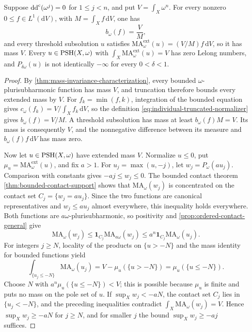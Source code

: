 \begin{theorem}\label{thm:invariant-mass-threshold-envelopes}
Suppose $\mathrm{dd}^{\mathrm{c}}(\omega^j)=0$ for $1\leq j<n$, and put $V=\int_X\omega^n$. For every nonzero $0\leq f\in L^1(\mathrm{d}V)$, with $M=\int_Xf\,\mathrm{d}V$, one has
\[
 b_\omega(f)=\frac VM,
\]
and every threshold subsolution $u$ satisfies $\mathrm{MA}^{\mathrm{ext}}_\omega(u)=(V/M)f\,\mathrm{d}V$, so it has mass $V$. Every $u\in\mathrm{PSH}(X,\omega)$ with $\int_X\mathrm{MA}^{\mathrm{ext}}_\omega(u)=V$ has zero Lelong numbers, and $P_{\delta\omega}(u)$ is not identically $-\infty$ for every $0<\delta<1$.
\end{theorem}
\begin{proof}
By \cref{thm:mass-invariance-characterization}, every bounded $\omega$-plurisubharmonic function has mass $V$, and truncation therefore bounds every extended mass by $V$. For $f_k=\min(f,k)$, integration of the bounded equation gives $c_\omega(f_k)=V/\int_Xf_k\,\mathrm{d}V$, so the definition \eqref{eq:individual-truncated-normalizer} gives $b_\omega(f)=V/M$. A threshold subsolution has mass at least $b_\omega(f)M=V$. Its mass is consequently $V$, and the nonnegative difference between its measure and $b_\omega(f)f\,\mathrm{d}V$ has mass zero.

Now let $u\in\mathrm{PSH}(X,\omega)$ have extended mass $V$. Normalize $u\leq0$, put $\mu_u=\mathrm{MA}^{\mathrm{ext}}_\omega(u)$, and fix $a>1$. For $u_j=\max(u,-j)$, let $w_j=P_\omega(au_j)$. Comparison with constants gives $-aj\leq w_j\leq0$. The bounded contact theorem \cref{thm:bounded-contact-support} shows that $\mathrm{MA}_\omega(w_j)$ is concentrated on the contact set $C_j=\{w_j=au_j\}$. Since the two functions are canonical representatives and $w_j\leq au_j$ almost everywhere, this inequality holds everywhere. Both functions are $a\omega$-plurisubharmonic, so positivity and \cref{prop:ordered-contact-general} give
\[
 \mathrm{MA}_\omega(w_j)
 \leq\mathbf1_{C_j}\mathrm{MA}_{a\omega}(w_j)
 \leq a^n\mathbf1_{C_j}\mathrm{MA}_\omega(u_j).
\]
For integers $j\geq N$, locality of the products on $\{u>-N\}$ and the mass identity for bounded functions yield
\[
 \int_{\{u_j\leq-N\}}\mathrm{MA}_\omega(u_j)
       =V-\mu_u(\{u>-N\})=\mu_u(\{u\leq-N\}).
\]
Choose $N$ with $a^n\mu_u(\{u\leq-N\})<V$; this is possible because $\mu_u$ is finite and puts no mass on the pole set of $u$. If $\sup_Xw_j<-aN$, the contact set $C_j$ lies in $\{u_j<-N\}$, and the preceding inequalities contradict $\int_X\mathrm{MA}_\omega(w_j)=V$. Hence $\sup_Xw_j\geq-aN$ for $j\geq N$, and for smaller $j$ the bound $\sup_Xw_j\geq-aj$ suffices.


\end{proof}

